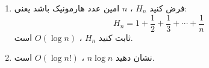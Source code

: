 \EXERCISE
\begin{enumerate}
\item
فرض کنید
$H_n$
،
$n$
امین عدد هارمونیک باشد یعنی:
$$H_n = 1 + \frac{1}{2} + \frac{1}{3} + \cdots + \frac{1}{n}$$
ثابت کنید
$H_n$
،
$O(\log n)$
است.
\item
نشان دهید
$n\log n$
،
$O(\log n!)$
است.
\end{enumerate}